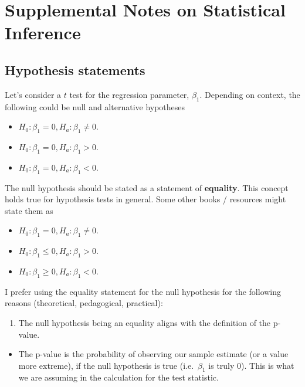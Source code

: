 \documentclass[
]{book}
\providecommand{\tightlist}{%
  \setlength{\itemsep}{0pt}\setlength{\parskip}{0pt}}
\begin{document}
\section{Supplemental Notes on Statistical Inference}\label{supplemental-notes-on-statistical-inference}

\subsection{Hypothesis statements}\label{hypothesis-statements}

Let's consider a \(t\) test for the regression parameter, \(\beta_1\). Depending on context, the following could be null and alternative hypotheses

\begin{itemize}
\tightlist
\item
  \(H_0: \beta_1 = 0, H_a: \beta_1 \neq 0\).
\item
  \(H_0: \beta_1 = 0, H_a: \beta_1 > 0\).
\item
  \(H_0: \beta_1 = 0, H_a: \beta_1 < 0\).
\end{itemize}

The null hypothesis should be stated as a statement of \textbf{equality}. This concept holds true for hypothesis tests in general. Some other books / resources might state them as

\begin{itemize}
\tightlist
\item
  \(H_0: \beta_1 = 0, H_a: \beta_1 \neq 0\).
\item
  \(H_0: \beta_1 \leq 0, H_a: \beta_1 > 0\).
\item
  \(H_0: \beta_1 \geq 0, H_a: \beta_1 < 0\).
\end{itemize}

I prefer using the equality statement for the null hypothesis for the following reasons (theoretical, pedagogical, practical):

\begin{enumerate}
\def\labelenumi{\arabic{enumi}.}
\tightlist
\item
  The null hypothesis being an equality aligns with the definition of the p-value.
\end{enumerate}

\begin{itemize}
\tightlist
\item
  The p-value is the probability of observing our sample estimate (or a value more extreme), if the null hypothesis is true (i.e.~\(\beta_1\) is truly 0). This is what we are assuming in the calculation for the test statistic.
\end{itemize}
\end{document}
